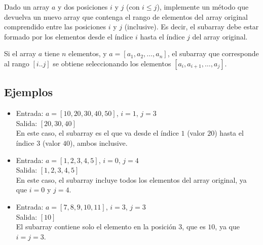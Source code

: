 Dado un array \(a\) y dos posiciones \(i\) y \(j\) (con \(i \leq j\)), implemente un método que devuelva un nuevo array que contenga el rango de elementos del array original comprendido entre las posiciones \(i\) y \(j\) (inclusive). Es decir, el subarray debe estar formado por los elementos desde el índice \(i\) hasta el índice \(j\) del array original.

Si el array \(a\) tiene \(n\) elementos, y \(a = [a_1, a_2, \dots, a_n]\), el subarray que corresponde al rango \([i..j]\) se obtiene seleccionando los elementos \([a_i, a_{i+1}, \dots, a_j]\).

\subsection*{Ejemplos}
\begin{itemize}
    \item Entrada: \(a = [10, 20, 30, 40, 50]\), \(i = 1\), \(j = 3\) \\
    Salida: \([20, 30, 40]\) \\
    En este caso, el subarray es el que va desde el índice \(1\) (valor \(20\)) hasta el índice \(3\) (valor \(40\)), ambos inclusive.

    \item Entrada: \(a = [1, 2, 3, 4, 5]\), \(i = 0\), \(j = 4\) \\
    Salida: \([1, 2, 3, 4, 5]\) \\
    En este caso, el subarray incluye todos los elementos del array original, ya que \(i = 0\) y \(j = 4\).
    
    \item Entrada: \(a = [7, 8, 9, 10, 11]\), \(i = 3\), \(j = 3\) \\
    Salida: \([10]\) \\
    El subarray contiene solo el elemento en la posición \(3\), que es \(10\), ya que \(i = j = 3\).
\end{itemize}